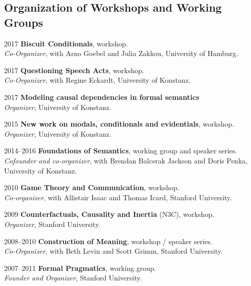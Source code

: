 \subsection*{Organization of Workshops and Working Groups}
\begin{dated}
	\item[2017]
		\textbf{Biscuit Conditionals}, workshop.\\
		\textit{Co-Organizer}, with Arno Goebel and Julia Zakkou, 
		University of Hamburg.
	\item[2017]
		\textbf{Questioning Speech Acts}, workshop.\\
		\textit{Co-Organizer}, with Regine Eckardt, 
		University of Konstanz.
	\item[2017]
		 \textbf{Modeling causal dependencies in formal semantics}\\
		 \textit{Organizer}, 
		 University of Konstanz.
	\item[2015] 
		\textbf{New work on modals, conditionals and evidentials}, workshop.\\
		\textit{Organizer}, 
		University of Konstanz.
	\item[2014--2016]
		\textbf{Foundations of Semantics}, working group and speaker series.\\
		\textit{Cofounder and co-organizer}, with Brendan Balcerak Jackson and Doris Penka,\\ 
		University of Konstanz.
	\item[2010]
		\textbf{Game Theory and Communication}, workshop.\\
 		\textit{Co-organizer}, with Allistair Isaac and Thomas Icard, 
 		Stanford University.
 	\item[2009]
	 	\textbf{Counterfactuals, Causality and Inertia} (N3C), workshop.\\
       	\textit{Organizer}, 
       	Stanford University.
     \item[2008--2010]
     	\textbf{Construction of Meaning}, workshop / speaker series.\\
		\textit{Co-Organizer}, with Beth Levin and Scott Grimm, 
		Stanford University.
	\item[2007--2011]
		\textbf{Formal Pragmatics}, working group.\\
		\textit{Founder and Organizer}, 
		Stanford University.
\end{dated}